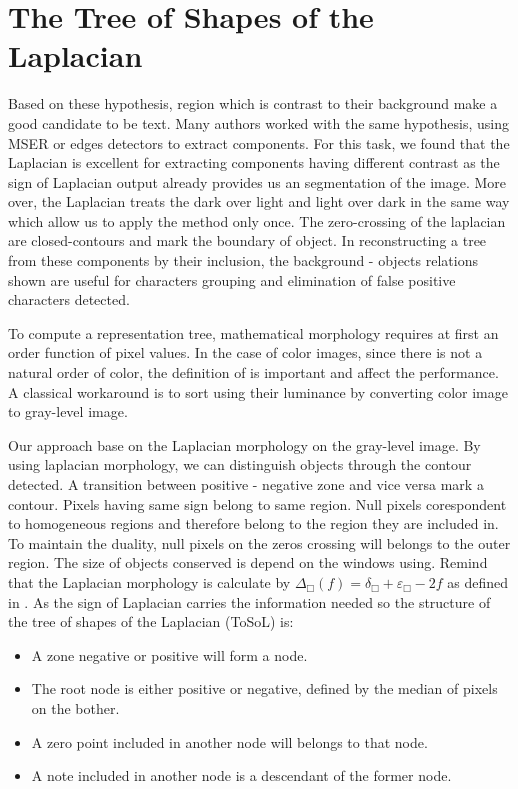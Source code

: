 \section{The Tree of Shapes of the Laplacian}
\par
Based on these hypothesis, region which is contrast to their background make a good candidate to be text. Many authors worked with the same hypothesis, using MSER \cite{Neumann12} \cite{xucheng.2013.pami} \cite{Shi_2013:_MSER} or edges detectors \cite{Liu.2006.CRA} \cite{Yan:2011:Nerocomputing} to extract components. For this task, we found that the Laplacian is excellent for extracting components having different contrast as the sign of Laplacian output already provides us an segmentation of the image. More over, the Laplacian treats the dark over light and light over dark in the same way which allow us to apply the method only once. The zero-crossing of the laplacian are closed-contours and mark the boundary of object. In reconstructing a tree from these components by their inclusion, the background - objects relations shown are useful for characters grouping and elimination of false positive characters detected.
\par
To compute a representation tree, mathematical morphology requires at first an order function of pixel values. In the case of color images, since there is not a natural order of color, the definition of is important and affect the performance. A classical workaround is to sort using their luminance by converting color image to gray-level image. 
\par
Our approach base on the Laplacian morphology on the gray-level image. By using laplacian morphology, we can distinguish objects through the contour detected. A transition between positive - negative zone and vice versa mark a contour. Pixels having same sign belong to same region. Null pixels corespondent to homogeneous regions and therefore belong to the region they are included in. To maintain the duality, null pixels on the zeros crossing will belongs to the outer region. The size of objects conserved is depend on the windows using. Remind that the Laplacian morphology is calculate by $ \Delta_\Box (f) = \delta_\Box + \varepsilon_\Box -2f $ as defined in \cite{Vliet_anedge}. As the sign of Laplacian carries the information needed so the structure of the tree of shapes of the Laplacian (ToSoL) is:
\begin{itemize}
\item A zone negative or positive will form a node.
\item The root node is either positive or negative, defined by the median of pixels on the bother.
\item A zero point included in another node will belongs to that node.
\item A note included in another node is a descendant of the former node.
\end{itemize}
